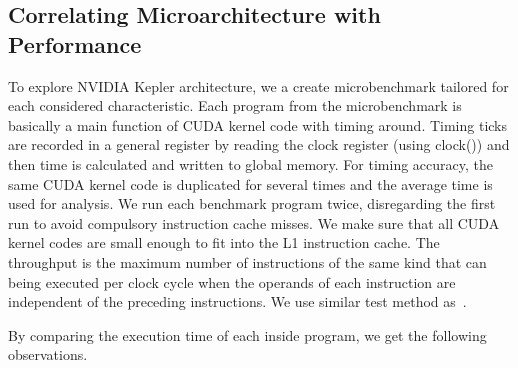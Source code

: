 \subsection{Correlating Microarchitecture with Performance}
\label{sec:benchmark}


To explore NVIDIA Kepler architecture, we a create microbenchmark tailored for each considered characteristic.
Each program from the microbenchmark is basically a main function of CUDA kernel code with timing around.
Timing ticks are recorded in a general register by reading the clock register (using clock()) and then time is calculated and written to global memory.
For timing accuracy, the same CUDA kernel code is duplicated for several times and the average time is used for analysis.
We run each benchmark program twice, disregarding the first run to avoid compulsory instruction cache misses. 
We make sure that all CUDA kernel codes are small enough to fit into the L1 instruction cache.
The throughput is the maximum number of instructions of the same kind that can being executed per clock
cycle when the operands of each instruction are independent of the preceding instructions.
We use similar test method as~\cite{fog}.

By comparing the execution time of each inside program, we get the following observations.

